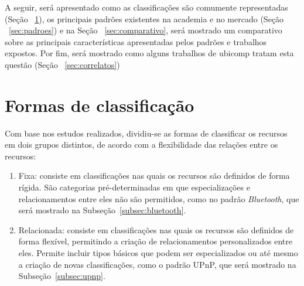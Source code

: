 A seguir, será apresentado como as classificações são comumente representadas (Seção ~\ref{sec:formasDeClass}), os principais padrões existentes na academia e no mercado (Seção ~\ref{sec:padroes}) e na Seção ~\ref{sec:comparativo}, será mostrado um comparativo sobre as principais características apresentadas pelos padrões e trabalhos expostos. Por fim, será mostrado como alguns trabalhos de ubicomp tratam esta questão (Seção ~\ref{sec:correlatos})

\section{Formas de classificação}
\label{sec:formasDeClass}

Com base nos estudos realizados, dividiu-se as formas de classificar os recursos em dois grupos distintos, de acordo com a flexibilidade das relações entre os recursos:

\begin{enumerate}
	\item Fixa: consiste em classificações nas quais os recursos são definidos de forma rígida. São categorias pré-determinadas em que especializações e relacionamentos entre eles não são permitidos, como no padrão \emph{Bluetooth}, que será mostrado na Subseção~\ref{subsec:bluetooth}.

	\item Relacionada: consiste em classificações nas quais os recursos são definidos de forma flexível, permitindo a criação de relacionamentos personalizados entre eles. Permite incluir tipos básicos que podem ser especializados ou até mesmo a criação de novas classificações, como o padrão UPnP, que será mostrado na Subseção~\ref{subsec:upnp}.
\end{enumerate}

